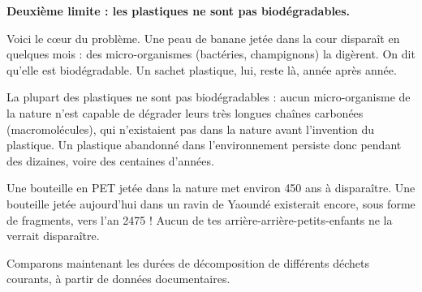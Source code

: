 \documentclass[11pt]{article}
\newcommand{\cle}[1]{{\popxbold\color{popdark}#1}}
\begin{document}
\textbf{Deuxième limite : les plastiques ne sont pas biodégradables.}

Voici le cœur du problème. Une peau de banane jetée dans la cour disparaît en quelques mois : des micro-organismes (bactéries, champignons) la digèrent. On dit qu'elle est \cle{biodégradable}. Un sachet plastique, lui, reste là, année après année.

\begin{propriete}
La plupart des plastiques ne sont \cle{pas biodégradables} : aucun micro-organisme de la nature n'est capable de dégrader leurs très longues chaînes carbonées (macromolécules), qui n'existaient pas dans la nature avant l'invention du plastique. Un plastique abandonné dans l'environnement persiste donc pendant des dizaines, voire des centaines d'années.
\end{propriete}

\begin{exemplebox}
Une bouteille en PET jetée dans la nature met environ \cle{450 ans} à disparaître. Une bouteille jetée aujourd'hui dans un ravin de Yaoundé existerait encore, sous forme de fragments, vers l'an 2475 ! Aucun de tes arrière-arrière-petits-enfants ne la verrait disparaître.
\end{exemplebox}

Comparons maintenant les durées de décomposition de différents déchets courants, à partir de données documentaires.
\end{document}
